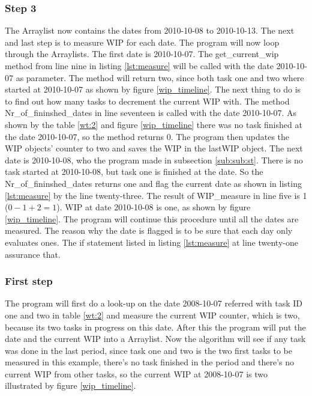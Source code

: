 \documentclass[UKenglish]{ifimaster}  %
\begin{document}
\subsubsection{Step 3}
The Arraylist now contains the dates from 2010-10-08 to 2010-10-13. The next and last step is to measure WIP for each date.  The program will now loop through the Arraylists. The first date is 2010-10-07.  The get\_current\_wip method from line nine in listing \ref{lst:measure} will be called with the date 2010-10-07 as parameter.  The method will return two, since both task one and two where started at 2010-10-07 as shown by figure \ref{wip_timeline}. The next thing to do is to find out how many tasks to decrement the current WIP with.  The method Nr\_of\_fininshed\_dates in line seventeen is called with the date 2010-10-07. As shown by the table \ref{wt:2} and figure \ref{wip_timeline} there was no task finished at the date 2010-10-07, so the method returns 0. The program then updates the WIP objects' counter to two and saves the WIP in the lastWIP object. The next date is 2010-10-08, who the program made in subsection \ref{sub:sub:st}. There is no task started at 2010-10-08, but task one is finished at the date. So the Nr\_of\_fininshed\_dates returns one and flag the current date as shown in listing \ref{lst:measure} by the line twenty-three. The result of WIP\_measure in line five is 1 ($0-1+2=1$). WIP at date 2010-10-08 is one, as shown by figure \ref{wip_timeline}. The program will continue this procedure until all the dates are measured.  The reason why the date is flagged is to be sure that each day only evaluates ones. The if statement listed in listing \ref{lst:measure} at line twenty-one assurance that.

\iffalse
\subsubsection{First step}
\label{subsubsec:ft}
The program will first do a look-up on the date 2008-10-07 referred with task ID one and two in table \ref{wt:2} and measure the current WIP counter, which is two, because its two tasks in progress on this date. After this the program will put the date and the current WIP into a Arraylist. 
Now the algorithm will see if any task was done in the last period, since task one and two is the two first tasks to be measured in this example, there's no task finished in the period and there's no current WIP from other tasks, so the current WIP at 2008-10-07 is two illustrated by figure \ref{wip_timeline}. 
\end{document}
